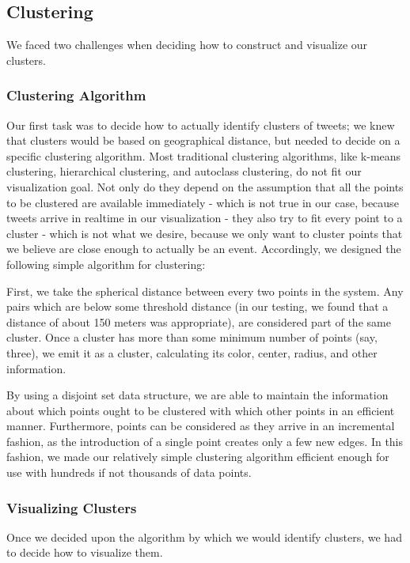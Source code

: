 \documentclass[pdftex,12pt,a4paper]{article}
\begin{document}
\subsection{Clustering}
We faced two challenges when deciding how to construct and visualize our clusters.

\subsubsection{Clustering Algorithm}
Our first task was to decide how to actually identify clusters of tweets; we knew that clusters would be based on geographical distance, but needed to decide on a specific clustering algorithm. Most traditional clustering algorithms, like k-means clustering, hierarchical clustering, and autoclass clustering, do not fit our visualization goal. Not only do they depend on the assumption that all the points to be clustered are available immediately - which is not true in our case, because tweets arrive in realtime in our visualization - they also try to fit every point to a cluster - which is not what we desire, because we only want to cluster points that we believe are close enough to actually be an event. Accordingly, we designed the following simple algorithm for clustering:

First, we take the spherical distance between every two points in the system.
Any pairs which are below some threshold distance (in our testing, we found that
a distance of about 150 meters was appropriate), are considered part of the same
cluster. Once a cluster has more than some minimum number of points (say,
three), we emit it as a cluster, calculating its color, center, radius, and
other information.

By using a disjoint set data structure, we are able to maintain the information
about which points ought to be clustered with which other points in an efficient
manner. Furthermore, points can be considered as they arrive in an incremental
fashion, as the introduction of a single point creates only a few new edges. In
this fashion, we made our relatively simple clustering algorithm efficient
enough for use with hundreds if not thousands of data points.

\subsubsection{Visualizing Clusters}
Once we decided upon the algorithm by which we would identify clusters, we had to decide how to visualize them. 
\end{document}
